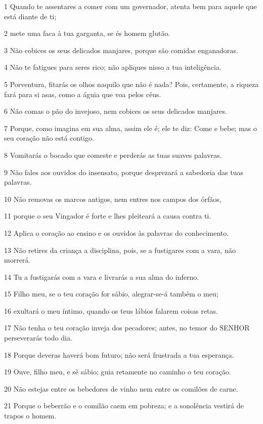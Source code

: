 \par 1 Quando te assentares a comer com um governador, atenta bem para aquele que está diante de ti;
\par 2 mete uma faca à tua garganta, se és homem glutão.
\par 3 Não cobices os seus delicados manjares, porque são comidas enganadoras.
\par 4 Não te fatigues para seres rico; não apliques nisso a tua inteligência.
\par 5 Porventura, fitarás os olhos naquilo que não é nada? Pois, certamente, a riqueza fará para si asas, como a águia que voa pelos céus.
\par 6 Não comas o pão do invejoso, nem cobices os seus delicados manjares.
\par 7 Porque, como imagina em sua alma, assim ele é; ele te diz: Come e bebe; mas o seu coração não está contigo.
\par 8 Vomitarás o bocado que comeste e perderás as tuas suaves palavras.
\par 9 Não fales aos ouvidos do insensato, porque desprezará a sabedoria das tuas palavras.
\par 10 Não removas os marcos antigos, nem entres nos campos dos órfãos,
\par 11 porque o seu Vingador é forte e lhes pleiteará a causa contra ti.
\par 12 Aplica o coração ao ensino e os ouvidos às palavras do conhecimento.
\par 13 Não retires da criança a disciplina, pois, se a fustigares com a vara, não morrerá.
\par 14 Tu a fustigarás com a vara e livrarás a sua alma do inferno.
\par 15 Filho meu, se o teu coração for sábio, alegrar-se-á também o meu;
\par 16 exultará o meu íntimo, quando os teus lábios falarem coisas retas.
\par 17 Não tenha o teu coração inveja dos pecadores; antes, no temor do SENHOR perseverarás todo dia.
\par 18 Porque deveras haverá bom futuro; não será frustrada a tua esperança.
\par 19 Ouve, filho meu, e sê sábio; guia retamente no caminho o teu coração.
\par 20 Não estejas entre os bebedores de vinho nem entre os comilões de carne.
\par 21 Porque o beberrão e o comilão caem em pobreza; e a sonolência vestirá de trapos o homem.
